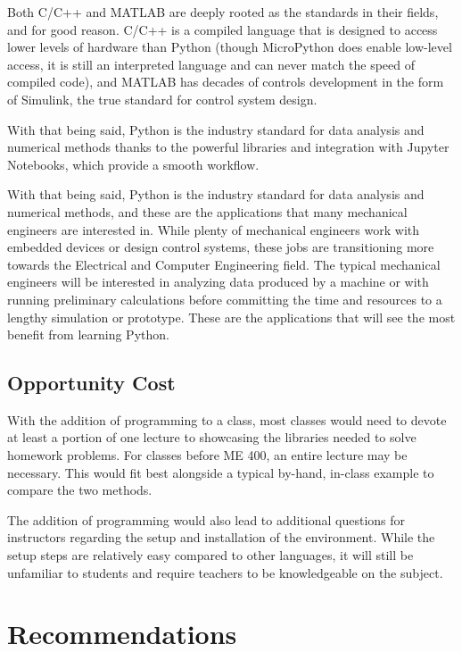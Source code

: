 Both C/C++ and MATLAB are deeply rooted as the standards in their fields,
and for good reason. C/C++ is a compiled language that is designed
to access lower levels of hardware than Python (though MicroPython does
enable low-level access, it is still an interpreted language and can
never match the speed of compiled code), and MATLAB has decades of controls
development in the form of Simulink, the true standard for control system 
design.

With that being said, Python is the industry standard for data analysis 
and numerical methods thanks to the powerful libraries and 
integration with Jupyter Notebooks, which provide a smooth workflow. 

With that being said, Python is the industry standard for data analysis 
and numerical methods, and these are the applications that many mechanical
engineers are interested in. While plenty of mechanical engineers work 
with embedded devices or design control systems, these jobs are 
transitioning more towards the Electrical and Computer Engineering field.
The typical mechanical engineers will be interested in analyzing data produced 
by a machine or with running preliminary calculations before committing
the time and resources to a lengthy simulation or prototype. These are 
the applications that will see the most benefit from learning Python.

\subsection{Opportunity Cost}

With the addition of programming to a class, most classes would need to devote
at least a portion of one lecture to showcasing the libraries needed to 
solve homework problems. For classes before ME 400, an entire lecture may
be necessary. This would fit best alongside a typical by-hand, in-class
example to compare the two methods.

The addition of programming would also lead to additional questions for
instructors regarding the setup and installation of the environment. While
the setup steps are relatively easy compared to other languages, it will
still be unfamiliar to students and require teachers to be knowledgeable
on the subject.

\section{Recommendations}

